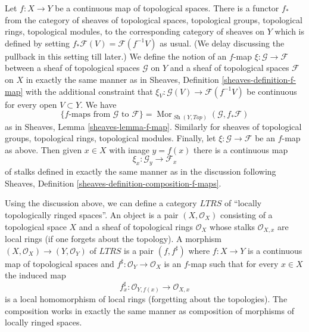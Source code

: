\documentclass{stacks-project}
\theoremstyle{plain}
\theoremstyle{definition}
\theoremstyle{remark}
\numberwithin{equation}{subsection}
\def\Mor{\mathop{\mathrm{Mor}}\nolimits}
\def\Sh{\mathop{\mathit{Sh}}\nolimits}
\begin{document}
\medskip\noindent
Let $f : X \to Y$ be a continuous map of topological spaces.
There is a functor $f_*$ from the category of sheaves of topological
spaces, topological groups, topological rings, topological modules,
to the corresponding category of sheaves on $Y$ which is defined by setting
$f_*\mathcal{F}(V) = \mathcal{F}(f^{-1}V)$ as usual.
(We delay discussing the pullback in this setting till later.)
We define the notion of an $f$-map $\xi : \mathcal{G} \to \mathcal{F}$
between a sheaf of topological spaces $\mathcal{G}$ on $Y$ and
a sheaf of topological spaces $\mathcal{F}$ on $X$ in exactly the
same manner as in Sheaves, Definition \ref{sheaves-definition-f-map}
with the additional constraint that
$\xi_V : \mathcal{G}(V) \to \mathcal{F}(f^{-1}V)$ be continuous
for every open $V \subset Y$. We have
$$
\{f\text{-maps from }\mathcal{G}\text{ to }\mathcal{F}\} =
\Mor_{\Sh(Y, \textit{Top})}(\mathcal{G}, f_*\mathcal{F})
$$
as in Sheaves, Lemma \ref{sheaves-lemma-f-map}. Similarly for
sheaves of topological groups, topological rings, topological modules. Finally,
let $\xi : \mathcal{G} \to \mathcal{F}$ be an $f$-map as above.
Then given $x \in X$ with image $y = f(x)$ there is a continuous
map
$$
\xi_x : \mathcal{G}_y \longrightarrow \mathcal{F}_x
$$
of stalks defined in exactly the same manner as in the discussion
following Sheaves, Definition \ref{sheaves-definition-composition-f-maps}.

\medskip\noindent
Using the discussion above, we can define a category $LTRS$ of
``locally topologically ringed spaces''. An object is a pair
$(X, \mathcal{O}_X)$ consisting of a topological space
$X$ and a sheaf of topological rings $\mathcal{O}_X$ whose stalks
$\mathcal{O}_{X, x}$ are local rings (if one forgets about the topology).
A morphism $(X, \mathcal{O}_X) \to (Y, \mathcal{O}_Y)$ of
$LTRS$ is a pair $(f, f^\sharp)$ where $f : X \to Y$ is a continuous
map of topological spaces and $f^\sharp : \mathcal{O}_Y \to \mathcal{O}_X$
is an $f$-map such that for every $x \in X$ the induced map
$$
f^\sharp_x : \mathcal{O}_{Y, f(x)} \longrightarrow \mathcal{O}_{X, x}
$$
is a local homomorphism of local rings (forgetting about the topologies).
The composition works in exactly the same manner as composition of
morphisms of locally ringed spaces.
\end{document}
